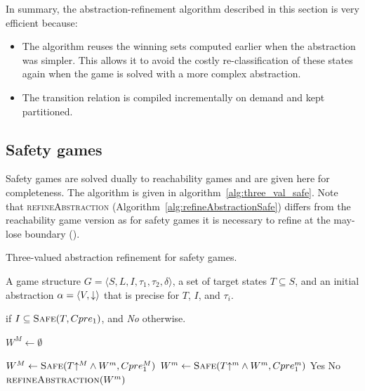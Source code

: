 In summary, the abstraction-refinement algorithm described in this section is very efficient because:
\begin{itemize}
    \item The algorithm reuses the winning sets computed earlier when the abstraction was simpler. This allows it to avoid the costly re-classification of these states again when the game is solved with a more complex abstraction.
    \item The transition relation is compiled incrementally on demand and kept partitioned. 
\end{itemize}

\subsection{Safety games}

Safety games are solved dually to reachability games and are given here for completeness. The algorithm is given in algorithm~\ref{alg:three_val_safe}. Note that \textsc{refineAbstraction} (Algorithm~\ref{alg:refineAbstractionSafe}) differs from the reachability game version as for safety games it is necessary to refine at the may-lose boundary (\cite{Alfaro_Roy_07}).

\begin{algorithm}
\caption{Three-valued abstraction refinement for safety games.}
\label{alg:three_val_safe}

\begin{algorithmic}[1]

\Require A game structure $G = \langle S, L, I, \tau_1, \tau_2, \delta \rangle$, a set 
of target states $T\subseteq S$, and an initial abstraction $\alpha=\langle V, \mathord{\downarrow} \rangle$
that is precise for $T$, $I$, and $\tau_i$.

 if $I \subseteq \textsc{Safe}(T, Cpre_1)$, and {\it No} otherwise.

    \State $W^M \gets \emptyset$

    \Loop
        \State $W^M \gets \textsc{Safe}(T\mathord{\uparrow^M} \wedge W^m, Cpre_1^M)$
        \State $W^m \gets \textsc{Safe}(T\mathord{\uparrow^m} \wedge W^m, Cpre_1^m)$
            \State\Return Yes
            \State\Return No
        \Else       
            \State$\Call{refineAbstraction}{W^m}$
        \EndIf
    \EndLoop
\EndFunction

\end{algorithmic}
\end{algorithm}

